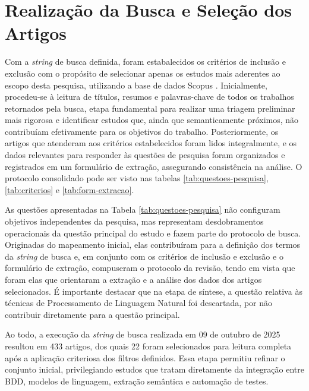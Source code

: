 \section{Realização da Busca e Seleção dos Artigos}

Com a \textit{string} de busca definida, foram estabalecidos os critérios de inclusão e exclusão com o propósito de selecionar apenas os estudos mais aderentes ao escopo desta pesquisa, utilizando a base de dados Scopus . Inicialmente, procedeu-se à leitura de títulos, resumos e palavras-chave de todos os trabalhos retornados pela busca, etapa fundamental para realizar uma triagem preliminar mais rigorosa e identificar estudos que, ainda que semanticamente próximos, não contribuíam efetivamente para os objetivos do trabalho. Posteriormente, os artigos que atenderam aos critérios estabelecidos foram lidos integralmente, e os dados relevantes para responder às questões de pesquisa foram organizados e registrados em um formulário de extração, assegurando consistência na análise. O protocolo consolidado pode ser visto nas tabelas \ref{tab:questoes-pesquisa}, \ref{tab:criterios} e \ref{tab:form-extracao}. 

As questões apresentadas na Tabela \ref{tab:questoes-pesquisa} não configuram objetivos independentes da pesquisa, mas representam desdobramentos operacionais da questão principal do estudo e fazem parte do protocolo de busca. Originadas do mapeamento inicial, elas contribuíram para a definição dos termos da \textit{string} de busca e, em conjunto com os critérios de inclusão e exclusão e o formulário de extração, compuseram o protocolo da revisão, tendo em vista que foram elas que orientaram a extração e a análise dos dados dos artigos selecionados. É importante destacar que na etapa de síntese, a questão relativa às técnicas de Processamento de Linguagem Natural foi descartada, por não contribuir diretamente para a questão principal.


Ao todo, a execução da \textit{string} de busca realizada em 09 de outubro de 2025 resultou em 433 artigos, dos quais 22 foram selecionados para leitura completa após a aplicação criteriosa dos filtros definidos. Essa etapa permitiu refinar o conjunto inicial, privilegiando estudos que tratam diretamente da integração entre BDD, modelos de linguagem, extração semântica e automação de testes.

